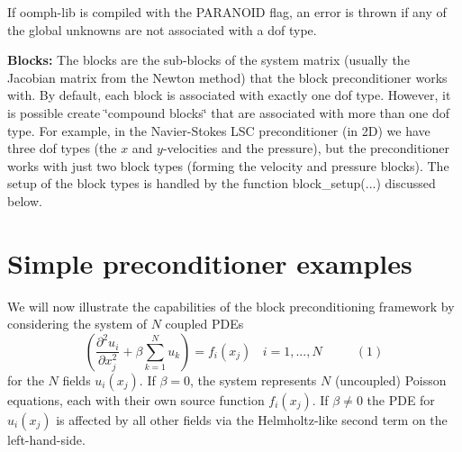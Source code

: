 \begin{DoxyItemize}
 If {\ttfamily oomph-\/lib} is compiled with the {\ttfamily P\+A\+R\+A\+N\+O\+ID} flag, an error is thrown if any of the global unknowns are not associated with a dof type.~\newline
~\newline

\item {\bfseries Blocks\+:} The blocks are the sub-\/blocks of the system matrix (usually the Jacobian matrix from the Newton method) that the block preconditioner works with. By default, each block is associated with exactly one dof type. However, it is possible create \char`\"{}compound blocks\char`\"{} that are associated with more than one dof type. For example, in the Navier-\/\+Stokes L\+SC preconditioner (in 2D) we have three dof types (the $x$ and $y$-\/velocities and the pressure), but the preconditioner works with just two block types (forming the velocity and pressure blocks). The setup of the block types is handled by the function {\ttfamily block\+\_\+setup}(...) discussed below.
\end{DoxyItemize}\hypertarget{index_multi_poisson}{}\section{Simple preconditioner examples}\label{index_multi_poisson}
We will now illustrate the capabilities of the block preconditioning framework by considering the system of $ N $ coupled P\+D\+Es \[ \left( \frac{\partial^2 u_i}{\partial x_j^2} + \beta \sum_{k=1}^{N} u_k \right) = f_i(x_j) \ \ \ \ i=1,...,N \ \ \ \ \ \ \ \ \ \ \ \ (1) \] for the $ N $ fields $ u_i(x_j) $. If $ \beta=0 $, the system represents $ N $ (uncoupled) Poisson equations, each with their own source function $ f_i(x_j). $ If $ \beta \ne 0 $ the P\+DE for $ u_i(x_j) $ is affected by all other fields via the Helmholtz-\/like second term on the left-\/hand-\/side.

